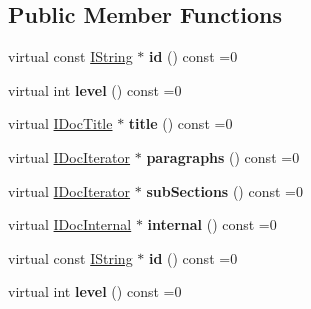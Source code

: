 \subsection*{Public Member Functions}
\begin{DoxyCompactItemize}
\item 
\mbox{\label{class_i_doc_section_ac159f043b80af24b508ada288646b829}} 
virtual const \mbox{\hyperlink{class_i_string}{I\+String}} $\ast$ {\bfseries id} () const =0
\item 
\mbox{\label{class_i_doc_section_af8609952a8ac7c8a458c7a133213b411}} 
virtual int {\bfseries level} () const =0
\item 
\mbox{\label{class_i_doc_section_ab78d4981f4cfddd04e0497025d72d2a0}} 
virtual \mbox{\hyperlink{class_i_doc_title}{I\+Doc\+Title}} $\ast$ {\bfseries title} () const =0
\item 
\mbox{\label{class_i_doc_section_a728acdcea61144ff470933760497527b}} 
virtual \mbox{\hyperlink{class_i_doc_iterator}{I\+Doc\+Iterator}} $\ast$ {\bfseries paragraphs} () const =0
\item 
\mbox{\label{class_i_doc_section_ade9bbb77b197b214c04864984fa7e50c}} 
virtual \mbox{\hyperlink{class_i_doc_iterator}{I\+Doc\+Iterator}} $\ast$ {\bfseries sub\+Sections} () const =0
\item 
\mbox{\label{class_i_doc_section_a89ab5759d6d9af151ab7185f42404051}} 
virtual \mbox{\hyperlink{class_i_doc_internal}{I\+Doc\+Internal}} $\ast$ {\bfseries internal} () const =0
\item 
\mbox{\label{class_i_doc_section_ac159f043b80af24b508ada288646b829}} 
virtual const \mbox{\hyperlink{class_i_string}{I\+String}} $\ast$ {\bfseries id} () const =0
\item 
\mbox{\label{class_i_doc_section_af8609952a8ac7c8a458c7a133213b411}} 
virtual int {\bfseries level} () const =0
\item 
\mbox{\label{class_i_doc_section_ab78d4981f4cfddd04e0497025d72d2a0}} 

\end{DoxyCompactItemize}
